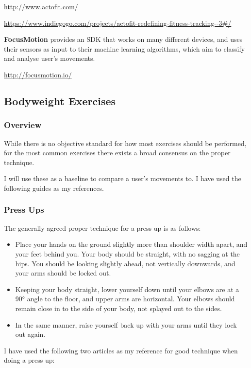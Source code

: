 \documentclass[a4paper]{article}
\begin{document}
\url{http://www.actofit.com/}

\url{https://www.indiegogo.com/projects/actofit-redefining-fitness-tracking--3#/}

\textbf{FocusMotion} provides an SDK that works on many different devices, and uses their sensors as input to their machine learning algorithms, which aim to classify and analyse user's movements.

\url{http://focusmotion.io/}

\subsection{Bodyweight Exercises}%

\subsubsection{Overview}

While there is no objective standard for how most exercises should be performed, for the most common exercises there exists a broad consensus on the proper technique.

I will use these as a baseline to compare a user's movements to. I have used the following guides as my references.

\subsubsection{Press Ups}

The generally agreed proper technique for a press up is as follows:

\begin{itemize}
    \item Place your hands on the ground slightly more than shoulder width apart, and your feet behind you. Your body should be straight, with no sagging at the hips. You should be looking slightly ahead, not vertically downwards, and your arms should be locked out.
    \item Keeping your body straight, lower yourself down until your elbows are at a 90° angle to the floor, and upper arms are horizontal. Your elbows should remain close in to the side of your body, not splayed out to the sides.
    \item In the same manner, raise yourself back up with your arms until they lock out again.
\end{itemize}


I have used the following two articles as my reference for good technique when doing a press up:
\end{document}
